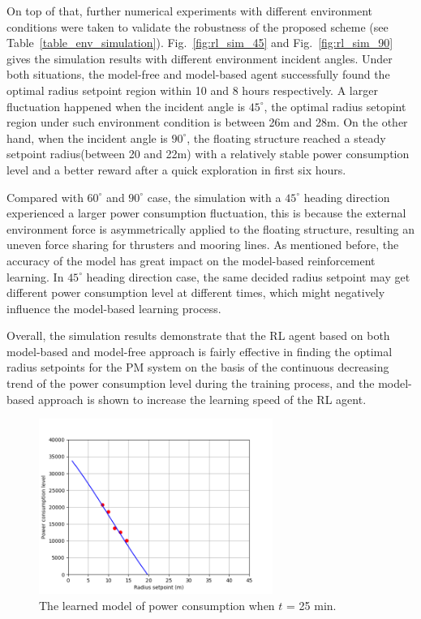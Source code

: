\begin{sloppypar}
On top of that, further numerical experiments with different environment conditions were taken to validate the robustness of the proposed scheme (see Table~\ref{table_env_simulation}). Fig.~\ref{fig:rl_sim_45} and Fig.~\ref{fig:rl_sim_90} gives the simulation results with different environment incident angles. Under both situations, the model-free and model-based agent successfully found the optimal radius setpoint region within 10 and 8 hours respectively. A larger fluctuation happened when the incident angle is $45^\circ$, the optimal radius setopint region under such environment condition is between 26m and 28m. On the other hand, when the incident angle is $90^\circ$, the floating structure reached a steady setpoint radius(between 20 and 22m) with a relatively stable power consumption level and a better reward after a quick exploration in first six hours. 

Compared with $60^\circ$ and $90^\circ$ case, the simulation with a $45^\circ$ heading direction experienced a larger power consumption fluctuation,  this is because the external environment force is asymmetrically applied to the floating structure, resulting an uneven force sharing for thrusters and mooring lines. As mentioned before, the accuracy of the model has great impact on the model-based reinforcement learning. In $45^\circ$ heading direction case, the same decided radius setpoint may get different power consumption level at different times, which might negatively influence the model-based learning process. 

Overall, the simulation results demonstrate that the RL agent based on both model-based and model-free approach is fairly effective in finding the optimal radius setpoints for the PM system on the basis of the continuous decreasing trend of the power consumption level during the training process, and the model-based approach is shown to increase the learning speed of the RL agent.


\begin{figure}[!htp]
	\centering
	\includegraphics[width=3in]{Images/reward_004.png}
	\caption{The learned model of power consumption when $t$ = 25 min.}
	\label{fig: start}
\end{figure}


\end{sloppypar}
